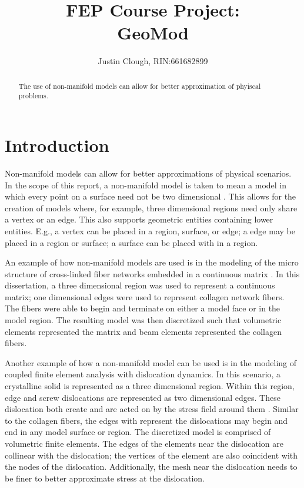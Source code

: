 \documentclass[a4paper, 12pt]{article}
\author{Justin Clough, RIN:661682899}
\title{FEP Course Project: \\
        GeoMod}
\begin{document}
\maketitle

\begin{abstract}
The use of non-manifold models can allow for better approximation of
phyiscal problems.
\end{abstract}

\newpage
\section{Introduction} \label{sec:intro}
Non-manifold models can allow for better approximations 
of physical scenarios. 
In the scope of this report, a non-manifold model is taken to mean 
a model in which every point on a surface need not be 
two dimensional \cite{weiler86}. 
This allows for the creation of models where, for example, three
dimensional regions need only share a vertex or an edge. This also 
supports geometric entities containing lower entities. E.g., a vertex
can be placed in a region, surface, or edge; a edge may be placed in
a region or surface; a surface can be placed with in a region.

An example of how non-manifold models are used is in 
the modeling of the micro structure of cross-linked 
fiber networks embedded in a continuous matrix \cite{zhangThesis}. 
In this dissertation, a three dimensional region was used to represent 
a continuous matrix; one dimensional edges were used to represent collagen 
network fibers. The fibers were able to begin and terminate on either a 
model face or in the model region. The resulting model was then discretized 
such that volumetric elements represented the matrix 
and beam elements represented the collagen fibers.

Another example of how a non-manifold model can be used is in the 
modeling of coupled finite element analysis with dislocation dynamics. 
In this scenario, a crystalline solid is represented as a three dimensional 
region. Within this region, edge and screw dislocations are represented
as two dimensional edges. These dislocation both create and are acted on
by the stress field around them \cite{askeland}. Similar to the collagen 
fibers, the edges with represent the dislocations may begin and end in
any model surface or region. The discretized model is comprised of 
volumetric finite elements. The edges of the elements near the dislocation 
are collinear with the dislocation; the vertices of the element are also
coincident with the nodes of the dislocation. Additionally, the mesh near
the dislocation needs to be finer to better approximate stress at the
dislocation.
\end{document}

